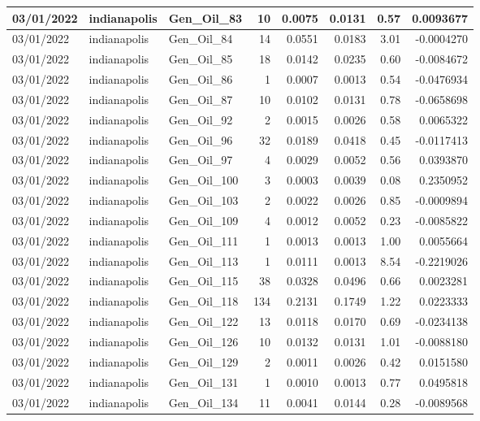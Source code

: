 \documentclass[
  letterpaper,
  DIV=11,
  numbers=noendperiod]{scrartcl}
\begin{document}
\begin{tabular}{l|l|l|r|r|r|r|r}
\hline
03/01/2022 & indianapolis & Gen\_Oil\_83 & 10 & 0.0075 & 0.0131 & 0.57 & 0.0093677\\
\hline
03/01/2022 & indianapolis & Gen\_Oil\_84 & 14 & 0.0551 & 0.0183 & 3.01 & -0.0004270\\
\hline
03/01/2022 & indianapolis & Gen\_Oil\_85 & 18 & 0.0142 & 0.0235 & 0.60 & -0.0084672\\
\hline
03/01/2022 & indianapolis & Gen\_Oil\_86 & 1 & 0.0007 & 0.0013 & 0.54 & -0.0476934\\
\hline
03/01/2022 & indianapolis & Gen\_Oil\_87 & 10 & 0.0102 & 0.0131 & 0.78 & -0.0658698\\
\hline
03/01/2022 & indianapolis & Gen\_Oil\_92 & 2 & 0.0015 & 0.0026 & 0.58 & 0.0065322\\
\hline
03/01/2022 & indianapolis & Gen\_Oil\_96 & 32 & 0.0189 & 0.0418 & 0.45 & -0.0117413\\
\hline
03/01/2022 & indianapolis & Gen\_Oil\_97 & 4 & 0.0029 & 0.0052 & 0.56 & 0.0393870\\
\hline
03/01/2022 & indianapolis & Gen\_Oil\_100 & 3 & 0.0003 & 0.0039 & 0.08 & 0.2350952\\
\hline
03/01/2022 & indianapolis & Gen\_Oil\_103 & 2 & 0.0022 & 0.0026 & 0.85 & -0.0009894\\
\hline
03/01/2022 & indianapolis & Gen\_Oil\_109 & 4 & 0.0012 & 0.0052 & 0.23 & -0.0085822\\
\hline
03/01/2022 & indianapolis & Gen\_Oil\_111 & 1 & 0.0013 & 0.0013 & 1.00 & 0.0055664\\
\hline
03/01/2022 & indianapolis & Gen\_Oil\_113 & 1 & 0.0111 & 0.0013 & 8.54 & -0.2219026\\
\hline
03/01/2022 & indianapolis & Gen\_Oil\_115 & 38 & 0.0328 & 0.0496 & 0.66 & 0.0023281\\
\hline
03/01/2022 & indianapolis & Gen\_Oil\_118 & 134 & 0.2131 & 0.1749 & 1.22 & 0.0223333\\
\hline
03/01/2022 & indianapolis & Gen\_Oil\_122 & 13 & 0.0118 & 0.0170 & 0.69 & -0.0234138\\
\hline
03/01/2022 & indianapolis & Gen\_Oil\_126 & 10 & 0.0132 & 0.0131 & 1.01 & -0.0088180\\
\hline
03/01/2022 & indianapolis & Gen\_Oil\_129 & 2 & 0.0011 & 0.0026 & 0.42 & 0.0151580\\
\hline
03/01/2022 & indianapolis & Gen\_Oil\_131 & 1 & 0.0010 & 0.0013 & 0.77 & 0.0495818\\
\hline
03/01/2022 & indianapolis & Gen\_Oil\_134 & 11 & 0.0041 & 0.0144 & 0.28 & -0.0089568\\

\end{tabular}
\end{document}
